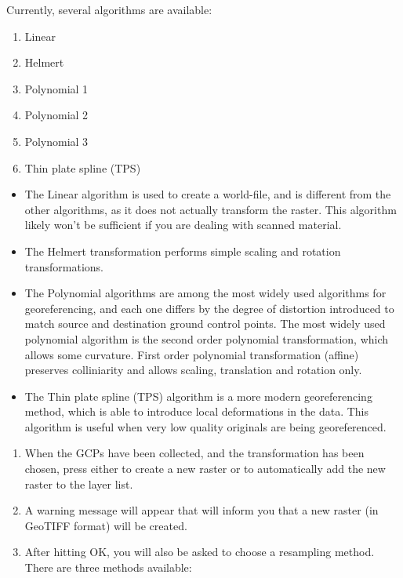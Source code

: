 Currently, several algorithms are available:

\begin{enumerate}
\item Linear
\item Helmert
\item Polynomial 1
\item Polynomial 2
\item Polynomial 3
\item Thin plate spline (TPS)
\end{enumerate}

\begin{itemize}[label=--]
\item The Linear algorithm is used to create a world-file, and is different from the other algorithms, as it does not actually transform the raster. This algorithm likely won't be sufficient if you are dealing with scanned material.
\item The Helmert transformation performs simple scaling and rotation transformations. 
\item The Polynomial algorithms are among the most widely used algorithms for georeferencing, and each one differs by the degree of distortion introduced to match source and destination ground control points. The most widely used polynomial algorithm is the second order polynomial transformation, which allows some curvature. First order polynomial transformation (affine) preserves colliniarity and allows scaling, translation and rotation only.
\item The Thin plate spline (TPS) algorithm is a more modern georeferencing method, which is able to introduce local deformations in the data. This algorithm is useful when very low quality originals are being georeferenced.
\end{itemize}

\label{georeferencer_running}

\begin{enumerate}
\item When the GCPs have been collected, and the transformation has been chosen, press either  to create a new raster or  to automatically add the new raster to the layer list.
\item A warning message will appear that will inform you that a new raster (in GeoTIFF format) will be created.
\item After hitting OK, you will also be asked to choose a resampling method. There are three methods available:
\end{enumerate}

